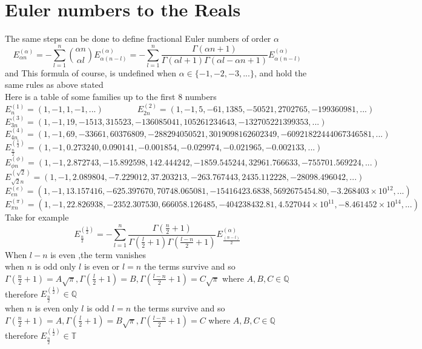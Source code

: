 \documentclass{article}
\begin{document}
\section{Euler numbers to the Reals}
The same steps can be done to define fractional Euler numbers of order $\alpha$
\[E^{(\alpha)}_{\alpha n}=  -\sum_{l=1}^{n} \binom{\alpha n}{\alpha l}E^{(\alpha)}_{\alpha(n-l)} = -\sum^{n}_{l=1} \frac{\Gamma
(\alpha n +1)}{\Gamma(\alpha l + 1)\Gamma(\alpha l - \alpha n + 1)} E^{(\alpha)}_{\alpha (n-l)}\]
and
This formula of course, is undefined when $\alpha\in\{-1,-2,-3,...\}$, and hold the same rules as above stated\\
Here is a table of some families up to the first 8 numbers
\[E^{(1)}_n = (1,-1,1,-1,...) \qquad \qquad E^{(2)}_{2n} = (1,-1,5,-61,1385,-50521,2702765,-199360981,...)\]
\[E^{(3)}_{3n} = (1,-1,19,-1513,315523,-136085041,105261234643,-132705221399353,...)\]
\[ E^{(4)}_{4n} = (1,-1,69,-33661,60376809,-288294050521,3019098162602349,-60921822444067346581,...)\]
\[E^{(\frac{1}{2})}_{\frac{n}{2}}=(1,-1,0.273240,0.090141,-0.001854,-0.029974,-0.021965,-0.002133,...)\]
\[E^{(\phi)}_{\phi n} = (1,-1,2.872743,-15.892598,142.444242,-1859.545244,32961.766633,-755701.569224,...)\]
\[E^{(\sqrt2)}_{\sqrt2 n} = (1,-1,2.089804,-7.229012,37.203213,-263.767443,2435.112228,-28098.496042,...)\]
\[E^{(e)}_{en}= (1,-1,13.157416,-625.397670,70748.065081,-15416423.6838,5692675454.80,-3.268403 \times 10^{12},...)\]
\[E^{(\pi)}_{\pi n} = (1,-1,22.826938,-2352.307530,666058.126485,-404238432.81,4.527044 \times 10^{11},-8.461452 \times 10^{14},...)\]
Take for example 
\[E^{(\frac{1}{2})}_{\frac{n}{2}} = -\sum^{n}_{l=1} \frac{\Gamma (\frac{n}{2}+1)}{\Gamma(\frac{l}{2} + 1)\Gamma(\frac{l-n}{2} + 1)} E^{(\alpha)}_{\frac{(n-l)}{2}}\]
When $l-n $ is even ,the term vanishes\\
when $n$ is odd only $l$ is even or $l=n$ the terms survive and so $\Gamma (\frac{n}{2}+1)=A\sqrt\pi,\Gamma (\frac{l}{2}+1)=B,\Gamma (\frac{l-n}{2}+1)=C\sqrt\pi$ where $A,B,C\in \mathbb{Q}$ therefore $E^{(\frac{1}{2})}_{\frac{n}{2}}\in\mathbb{Q}$\\
when $n$ is even only $l$ is odd $l=n$ the terms survive and so $\Gamma (\frac{n}{2}+1)=A,\Gamma (\frac{l}{2}+1)=B\sqrt\pi,\Gamma (\frac{l-n}{2}+1)=C$ where $A,B,C\in \mathbb{Q}$ therefore $E^{(\frac{1}{2})}_{\frac{n}{2}}\in\mathbb{T}$\\
\end{document}
